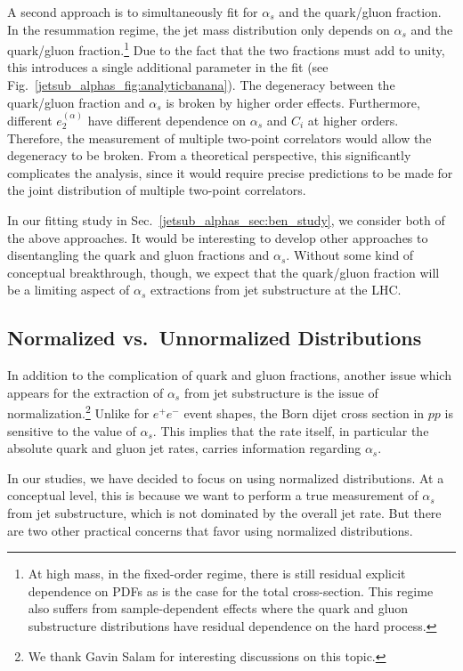 \documentclass[11pt]{cernrep}
\begin{document}
A second approach is to simultaneously fit for $\alpha_s$ and the quark/gluon fraction.
%
In the resummation regime, the jet mass distribution only depends on $\alpha_s$ and the quark/gluon fraction.\footnote{At high mass, in the fixed-order regime, there is still residual explicit dependence on PDFs as is the case for the total cross-section.  This regime also suffers from sample-dependent effects where the quark and gluon substructure distributions have residual dependence on the hard process.}
%
Due to the fact that the two fractions must add to unity, this introduces a single additional parameter in the fit (see Fig.~\ref{jetsub_alphas_fig:analyticbanana}).
%
The degeneracy between the quark/gluon fraction and $\alpha_s$ is broken by higher order effects.
%
Furthermore, different $e_2^{(\alpha)}$ have different dependence on $\alpha_s$ and $C_i$ at higher orders.
%
Therefore, the measurement of multiple two-point correlators would allow the degeneracy to be broken.
%
From a theoretical perspective, this significantly complicates the analysis, since it would require precise
predictions to be made for the joint distribution of multiple two-point correlators.


In our fitting study in Sec.~\ref{jetsub_alphas_sec:ben_study}, we consider both of the above approaches.
%
It would be interesting to develop other approaches to disentangling the quark and gluon fractions and $\alpha_s$.
%
Without some kind of conceptual breakthrough, though, we expect that the quark/gluon fraction will be a limiting aspect of $\alpha_s$ extractions from jet substructure at the LHC.

\subsection{Normalized vs.\ Unnormalized Distributions}
\label{subjetsub_alphas_sec:norm}

In addition to the complication of quark and gluon fractions, another issue which appears for the extraction of $\alpha_s$ from jet substructure is the issue of normalization.\footnote{We thank Gavin Salam for interesting discussions on this topic. }
%
Unlike for $e^+e^-$ event shapes, the Born dijet cross section in $pp$ is sensitive to the value of $\alpha_s$.
%
This implies that the rate itself, in particular the absolute quark and gluon jet rates, carries information regarding $\alpha_s$. 

In our studies, we have decided to focus on using normalized distributions.
%
At a conceptual level, this is because we want to perform a true measurement of $\alpha_s$ from jet substructure, which is not dominated by the overall jet rate.
%
But there are two other practical concerns that favor using normalized distributions.
\end{document}
